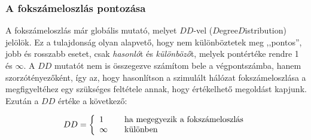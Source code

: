     \iffalse
    \subsubsection{Az út során érintett köztes csomópontok pontozása}
    A két csomópont közti út során érintett csúcsok pontértékét az $IV$ ($I$nside$V$ertices) jelöli. Ez a mutató algebra függő, mert vannak olyan problémák, ahol teljesen lényegtelen, hogy milyen csomópontokon halad végig az út, máshol viszont ez magát az útvonalválasztást befolyásoló tényező. Az algebrafüggésből adódóan itt a három eset (pontos, jobb, rosszabb) további pontosításra szorul\footnote{Ezt mindig az aktuális vizsgálatnál kell megtenni, lásd \aref{test}. fejezetet.}, a pontértékük rendre 5, 4 és 1 pont, hasonlóan a $HC$ mutatóhoz.
    \fi

    \subsubsection{A fokszámeloszlás pontozása}
    A fokszámeloszlás már globális mutató, melyet $DD$-vel ($D$egree$D$istribution) jelölök. Ez a tulajdonság olyan alapvető, hogy nem különböztetek meg ,,pontos'', jobb és rosszabb esetet, csak \textit{hasonló}t és \textit{különböző}t, melyek pontértéke rendre 1 és $\infty$. A $DD$ mutatót nem is összegezve számítom bele a végpontszámba, hanem szorzótényezőként, így az, hogy hasonlítson a szimulált hálózat fokszámeloszlása a megfigyeltéhez egy szükséges feltétele annak, hogy értékelhető megoldást kapjunk. Ezután a $DD$ értéke a következő:

    $$ DD = \left\{
    \begin{array}{l l}
      1 & \quad \text{ha megegyezik a fokszámeloszlás}\\
      \infty & \quad \text{különben}
    \end{array} \right.$$


